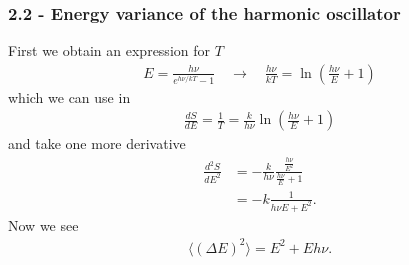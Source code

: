 \documentclass[10pt,a4paper]{book}
\theoremstyle{definition}
\begin{document}
\subsubsection{2.2 - Energy variance of the harmonic oscillator}
First we obtain an expression for $T$
\begin{align}
    E=\frac{h\nu}{e^{h\nu/kT}-1}\quad\rightarrow\quad\frac{h\nu}{kT}=\ln\left(\frac{h\nu}{E}+1\right)
\end{align}
which we can use in
\begin{align}
    \frac{dS}{dE}=\frac{1}{T}=\frac{k}{h\nu}\ln\left(\frac{h\nu}{E}+1\right)
\end{align}
and take one more derivative
\begin{align}
    \frac{d^2S}{dE^2}&=-\frac{k}{h\nu}\frac{\frac{h\nu}{E^2}}{\frac{h\nu}{E}+1}\\
    &=-k\frac{1}{ h\nu E+E^2}.
\end{align}
Now we see
\begin{align}
    \langle(\Delta E)^2\rangle=E^2+E h \nu.
\end{align}
\end{document}
